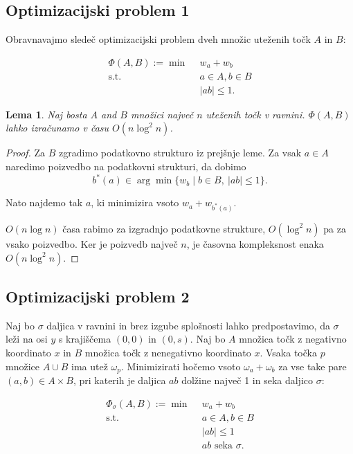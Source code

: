 \documentclass[a4paper, 12pt]{book}
\newtheorem{lema}[izrek]{Lema}
\begin{document}
\subsection{Optimizacijski problem 1}
Obravnavajmo sledeč optimizacijski problem dveh množic uteženih točk $A$ in $B$:

\begin{align*}
	\Phi(A,B) :=\min ~~		& w_a+w_b\\
	 \mbox{s.t.}~~ & a \in A, b\in B\\
				&	|ab|\le 1. 
\end{align*}

\begin{lema}
\label{le:within}
	Naj bosta $A$ and $B$ množici največ $n$ uteženih točk v ravnini.
	$\Phi(A,B)$ lahko izračunamo v času $O(n\log^2 n)$.
\end{lema}
\begin{proof}
Za $B$ zgradimo podatkovno strukturo iz prejšnje leme. Za vsak $a\in A$  naredimo poizvedbo na podatkovni strukturi, da dobimo
\[	
		b^*(a) \in \arg\min \{ w_b \mid b\in B,~|ab|\le 1\}.
	\]
	
Nato najdemo tak $a$, ki minimizira vsoto $w_a+w_{b^*(a)}$.

$O(n\log n)$ časa rabimo za izgradnjo podatkovne strukture, $O(\log^2 n)$ pa za vsako poizvedbo. Ker je poizvedb največ $n$, je časovna kompleksnost enaka $O(n\log^2 n)$.
\end{proof}



\subsection{Optimizacijski problem 2}

Naj bo $\sigma$ daljica v ravnini in brez izgube splošnosti lahko predpostavimo, da $\sigma$ leži na osi $y$ s krajiščema $(0,0)$ in $(0,s)$. Naj bo $A$ množica točk z negativno koordinato $x$ in $B$ množica točk z nenegativno koordinato $x$. Vsaka točka $p$ množice $A \cup B$ ima utež $\omega_p$. Minimizirati hočemo vsoto $\omega_a + \omega_b$ za vse take pare $(a,b) \in A \times B$, pri katerih je daljica $ab$ dolžine največ 1 in seka daljico $\sigma$:

\begin{align*}
	\Phi_\sigma(A,B) :=\min ~~		& w_a+w_b\\
	 \mbox{s.t.}~~ & a\in A, b\in B\\
				&	|ab|\le 1\\
				&	\mbox{$ab$ seka $\sigma$}. 
\end{align*}
\end{document}
